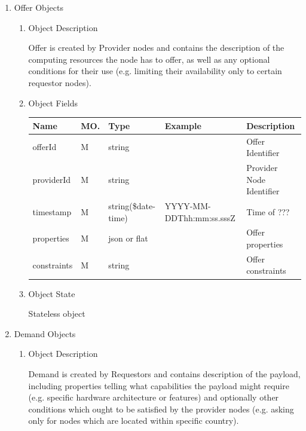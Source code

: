 \begin{enumerate}

\item Offer Objects

\begin{enumerate}

\item Object Description

Offer is created by Provider nodes and contains the description of the
computing resources the node has to offer, as well as any optional conditions
for their use (e.g. limiting their availability only to certain requestor nodes).

\item Object Fields

\begin{center}
\begin{tabular}{|p{3cm}|l|p{3cm}|p{3cm}|p{4cm}|} 
\hline
\rowcolor{lightgray}	Name	& MO.	& Type	& Example & 	Description \\
\hline

offerId 	& M & string & 		& Offer Identifier \\
\hline 		

providerId & M & string  & 		& Provider Node Identifier \\
\hline

timestamp	& M	& 	string(\$date-time)	& YYYY-MM-DDThh:mm:ss.sssZ	&	Time of ???  \\
\hline

properties	& M	& 	json or flat	&		&	Offer properties \\ 
\hline

constraints	& M	& 	string	&		&	Offer constraints \\ 
\hline

\end{tabular}
\end{center}

\item Object State

Stateless object

\end{enumerate}

\item Demand Objects

\begin{enumerate}

\item Object Description

Demand is created by Requestors and contains description of the
payload, including properties telling what capabilities the payload might
require (e.g. specific hardware architecture or features) and optionally other
conditions which ought to be satisfied by the provider nodes (e.g. asking only
for nodes which are located within specific country). 


\end{enumerate}
\end{enumerate}
